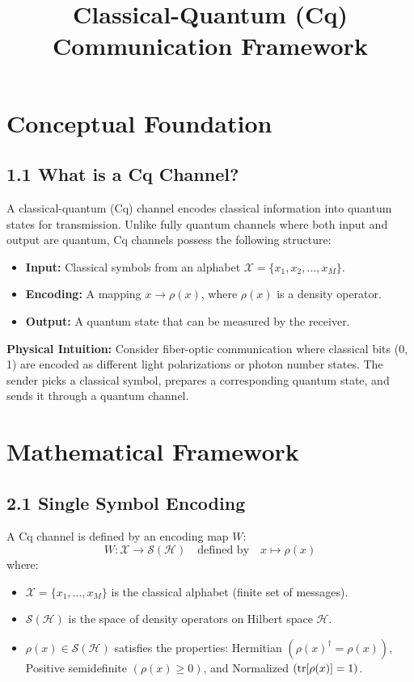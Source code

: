 \documentclass[12pt, a4paper]{article}
\title{Classical-Quantum (Cq) Communication Framework}
\author{}
\date{}
\begin{document}
\maketitle

\section{Conceptual Foundation}

\subsection{1.1 What is a Cq Channel?}
A classical-quantum (Cq) channel encodes classical information into quantum states for transmission. Unlike fully quantum channels where both input and output are quantum, Cq channels possess the following structure:
\begin{itemize}
    \item \textbf{Input:} Classical symbols from an alphabet $\mathcal{X}=\{x_{1},x_{2},...,x_{M}\}$.
    \item \textbf{Encoding:} A mapping $x\rightarrow\rho(x)$, where $\rho(x)$ is a density operator.
    \item \textbf{Output:} A quantum state that can be measured by the receiver.
\end{itemize}

\textbf{Physical Intuition:} Consider fiber-optic communication where classical bits (0, 1) are encoded as different light polarizations or photon number states. The sender picks a classical symbol, prepares a corresponding quantum state, and sends it through a quantum channel.

\section{Mathematical Framework}

\subsection{2.1 Single Symbol Encoding}
A Cq channel is defined by an encoding map $W$:
\begin{equation}
W:\mathcal{X}\rightarrow\mathcal{S}(\mathcal{H}) \quad \text{defined by} \quad x\mapsto\rho(x)
\end{equation}
where:
\begin{itemize}
    \item $\mathcal{X}=\{x_{1},...,x_{M}\}$ is the classical alphabet (finite set of messages).
    \item $\mathcal{S}(\mathcal{H})$ is the space of density operators on Hilbert space $\mathcal{H}$.
    \item $\rho(x)\in\mathcal{S}(\mathcal{H})$ satisfies the properties: Hermitian $(\rho(x)^{\dagger}=\rho(x))$, Positive semidefinite $(\rho(x)\ge0)$, and Normalized $(\tr[\rho(x)]=1)$.
\end{itemize}
\end{document}
